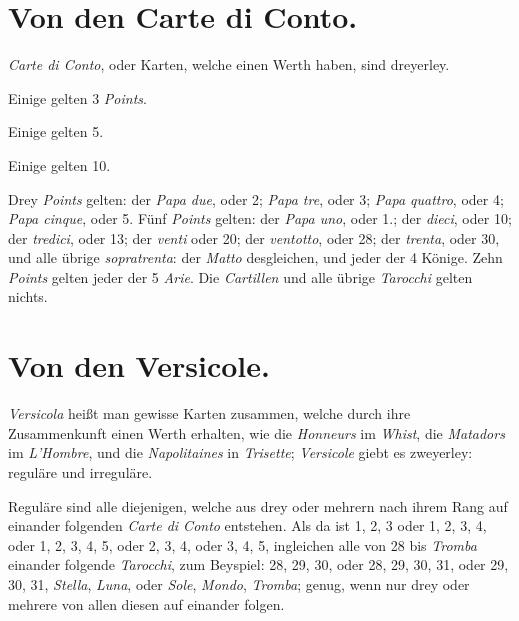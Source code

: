 \documentclass[11pt,a6paper,twoside]{article}
\begin{document}
\section{Von den Carte di Conto.}

\textit{Carte di Conto}, oder Karten, welche einen Werth haben, sind dreyerley.

Einige gelten 3 \textit{Points}.

Einige gelten 5.

Einige gelten 10.

Drey \textit{Points} gelten: der \textit{Papa due}, oder 2; \textit{Papa tre}, oder 3; \textit{Papa quattro}, oder 4; \textit{Papa cinque}, oder 5. Fünf \textit{Points} gelten: der \textit{Papa uno}, oder 1.; der \textit{dieci}, oder 10; der \textit{tredici}, oder 13; der \textit{venti} oder 20; der \textit{ventotto}, oder 28; der \textit{trenta}, oder 30, und alle übrige \textit{sopratrenta}: der \textit{Matto} desgleichen, und jeder der 4 Könige. Zehn \textit{Points} gelten jeder der 5 \textit{Arie}. Die \textit{Cartillen} und alle übrige \textit{Tarocchi} gelten nichts.


\section{Von den Versicole.}

\textit{Versicola} heißt man gewisse Karten zusammen, welche durch ihre Zusammenkunft einen Werth erhalten, wie die \textit{Honneurs} im \textit{Whist}, die \textit{Matadors} im \textit{L'Hombre}, und die \textit{Napolitaines} in \textit{Trisette}; \textit{Versicole} giebt es zweyerley: reguläre und irreguläre.

Reguläre sind alle diejenigen, welche aus drey oder mehrern nach ihrem Rang auf einander folgenden \textit{Carte di Conto} entstehen. Als da ist 1, 2, 3 oder 1, 2, 3, 4, oder 1, 2, 3, 4, 5, oder 2, 3, 4, oder 3, 4, 5, ingleichen alle von 28 bis \textit{Tromba} einander folgende \textit{Tarocchi}, zum Beyspiel: 28, 29, 30, oder 28, 29, 30, 31, oder 29, 30, 31, \textit{Stella}, \textit{Luna}, oder \textit{Sole}, \textit{Mondo}, \textit{Tromba}; genug, wenn nur drey oder mehrere von allen diesen auf einander folgen.
\end{document}
